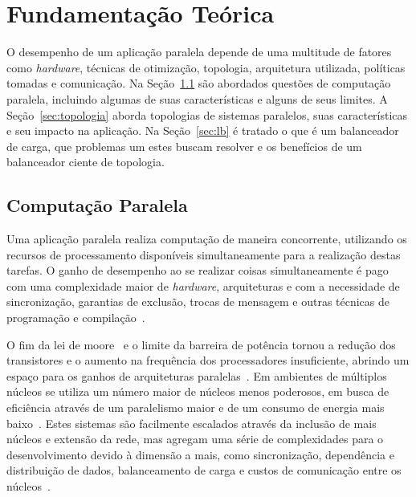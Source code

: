 \documentclass[
	12pt,				%
	openright,			%
	twoside,			%
	a4paper,			%
	english,			%
	brazil,				%
	]{abntex2}
\begin{document}




\chapter{Fundamentação Teórica}

O desempenho de um aplicação paralela depende de uma multitude de fatores como \textit{hardware}, técnicas de otimização, topologia, arquitetura utilizada, políticas tomadas e comunicação. Na Seção~\ref{sec:parellel} são abordados questões de computação paralela, incluindo algumas de suas características e alguns de seus limites. A Seção~\ref{sec:topologia} aborda topologias de sistemas paralelos, suas características e seu impacto na aplicação. Na Seção~\ref{sec:lb} é tratado o que é um balanceador de carga, que problemas um estes buscam resolver e os benefícios de um balanceador ciente de topologia.


\section{Computação Paralela}
\label{sec:parellel}

Uma aplicação paralela realiza computação de maneira concorrente, utilizando os recursos de processamento disponíveis simultaneamente para a realização destas tarefas. O ganho de desempenho ao se realizar coisas simultaneamente é pago com uma complexidade maior de \textit{hardware}, arquiteturas e com a necessidade de sincronização, garantias de exclusão, trocas de mensagem e outras técnicas de programação e compilação~\cite{david-encyclopedia}.

O fim da lei de moore~\cite{patterson} e o limite da barreira de potência tornou a redução dos transistores e o aumento na frequência dos processadores insuficiente, abrindo um espaço para os ganhos de arquiteturas paralelas~\cite{tanenbaum:operational_systems}. Em ambientes de múltiplos núcleos se utiliza um número maior de núcleos menos poderosos, em busca de eficiência através de um paralelismo maior e de um consumo de energia mais baixo~\cite{snir-encyclopedia}. Estes sistemas são facilmente escalados através da inclusão de mais núcleos e extensão da rede, mas agregam uma série de complexidades para o desenvolvimento devido à dimensão a mais, como sincronização, dependência e distribuição de dados, balanceamento de carga e custos de comunicação entre os núcleos~\cite{pilla-thesis}.
\end{document}

